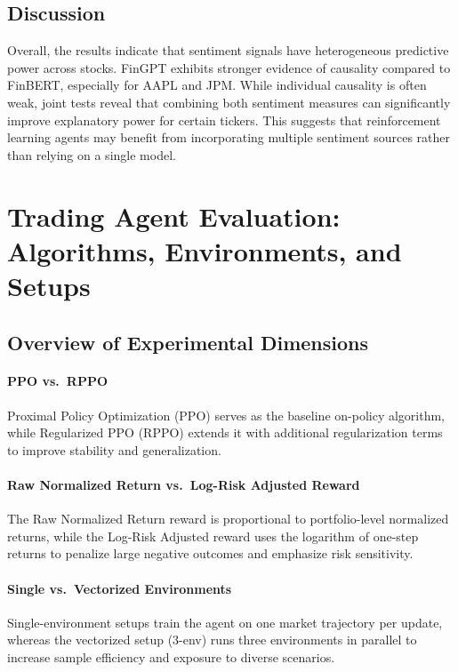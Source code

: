 \documentclass[12pt,a4paper]{report}
\begin{document}
\subsection{Discussion}
Overall, the results indicate that sentiment signals have heterogeneous predictive
power across stocks. FinGPT exhibits stronger evidence of causality compared to FinBERT,
especially for AAPL and JPM. While individual causality is often weak, joint tests
reveal that combining both sentiment measures can significantly improve explanatory
power for certain tickers. This suggests that reinforcement learning agents may benefit
from incorporating multiple sentiment sources rather than relying on a single model.


\section{Trading Agent Evaluation: Algorithms, Environments, and Setups}

\subsection{Overview of Experimental Dimensions}

\paragraph{PPO vs.\ RPPO}
Proximal Policy Optimization (PPO) serves as the baseline on-policy algorithm, while 
Regularized PPO (RPPO) extends it with additional regularization terms to improve stability 
and generalization.

\paragraph{Raw Normalized Return vs.\ Log-Risk Adjusted Reward}
The Raw Normalized Return reward is proportional to portfolio-level normalized returns, 
while the Log-Risk Adjusted reward uses the logarithm of one-step returns to penalize 
large negative outcomes and emphasize risk sensitivity.

\paragraph{Single vs.\ Vectorized Environments}
Single-environment setups train the agent on one market trajectory per update, 
whereas the vectorized setup (3-env) runs three environments in parallel to 
increase sample efficiency and exposure to diverse scenarios.
\end{document}
